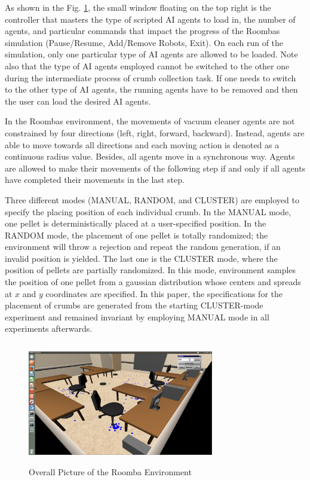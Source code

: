 \documentclass[conference]{IEEEtran}
\begin{document}
As shown in the Fig. \ref{roomba:world}, the small window floating on the top right
is the controller that masters the type of scripted AI agents to load in, the
number of agents, and particular commands that impact the progress of the
Roombas simulation (Pause/Resume, Add/Remove Robots, Exit). On each run of the
simulation, only one particular type of AI agents are allowed to be loaded.
Note also that the type of AI agents employed cannot be switched to the other
one during the intermediate process of crumb collection task. 
If one needs to switch to the other type of AI agents, the running agents have
to be removed and then the user can load the desired AI agents.

In the Roombas environment, the movements of vacuum cleaner agents are not
constrained by four directions (left, right, forward, backward). Instead,
agents are able to move towards all directions and each moving action is
denoted as a continuous radius value. Besides, all agents move in a
synchronous way. Agents are allowed to make their movements of the following
step if and only if all agents have completed their movements in the last step.

Three different modes (MANUAL, RANDOM, and CLUSTER) are employed to specify
the placing position of each individual crumb.
In the MANUAL mode, one pellet is deterministically placed at a user-specified
position. 
In the RANDOM mode, the placement of one pellet is totally randomized; the
environment will throw a rejection and repeat the random generation, if an
invalid position is yielded. The last one is the CLUSTER mode, where the
position of pellets are partially randomized. In this mode,
environment samples the position of one pellet from a gaussian distribution
whose centers and spreads at $x$ and $y$ coordinates are specified. 
In this paper, the specifications for the placement of crumbs are generated
from the starting CLUSTER-mode experiment and remained invariant by
employing MANUAL mode in all experiments afterwards.

\begin{figure}[!t]
\centering
\includegraphics[width=3.2in,height=2.1in]{./figures/roombas/roomba2.png}
\caption{Overall Picture of the Roomba Environment}
\label{roomba:world}
\end{figure}
\end{document}
